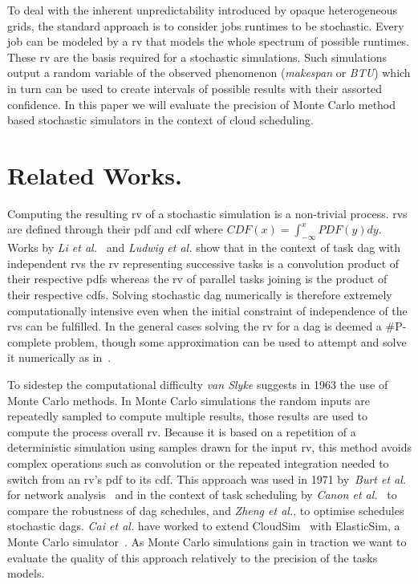 \documentclass[10pt,conference,compsocconf]{IEEEtran}
\newcommand{\etal}[1]{\emph{#1 et al.}}
\begin{document}
To deal with the inherent unpredictability introduced by opaque heterogeneous
grids, the standard approach is to consider jobs runtimes to be stochastic.
Every job can be modeled by a \ac{rv} that models the whole spectrum of
possible runtimes. These \ac{rv} are the basis required for a stochastic
simulations.  Such simulations output a random variable of the observed
phenomenon (\emph{makespan} or \emph{\ac{BTU}}) which in turn can be used to
create intervals of possible results with their assorted confidence. In this
paper we will evaluate the precision of Monte Carlo method based stochastic
simulators in the context of cloud scheduling.

\section{Related Works.}

Computing the resulting \ac{rv} of a stochastic simulation is a non-trivial
process.  \acp{rv} are defined through their \ac{pdf} and \ac{cdf} where $CDF(x)
= \int_{-\infty}^{x} PDF(y) dy$. Works by \etal{Li}~\cite{Li97} and
\etal{Ludwig}\cite{Ludwig01} show that in the context of task \ac{dag} with
independent \acp{rv} the \ac{rv} representing successive tasks is a convolution
product of their respective \acp{pdf} whereas the \ac{rv} of parallel tasks
joining is the product of their respective \acp{cdf}. Solving stochastic
\ac{dag} numerically is therefore extremely computationally intensive even when
the initial constraint of independence of the \acp{rv} can be fulfilled. In the
general cases solving the \ac{rv} for a \ac{dag} is deemed a \#P-complete
problem, though some approximation can be used to attempt and solve it
numerically as in~\cite{dodin85}.

To sidestep the computational difficulty \emph{van Slyke} suggests in
1963\cite{Slyke63} the use of Monte Carlo methods. In Monte Carlo
simulations the random inputs are repeatedly sampled to compute multiple
results, those results are used to compute the process overall \acl{rv}. Because
it is based on a repetition of a deterministic simulation using samples drawn
for the input \ac{rv}, this method avoids complex operations such as
convolution or the repeated integration needed to switch from an \ac{rv}'s
\ac{pdf} to its \ac{cdf}. This approach was used in 1971 by~\etal{Burt} for
network analysis~\cite{burt71} and in the context of task scheduling by
\etal{Canon}~\cite{Canon10} to compare the robustness of \ac{dag} schedules, and
\etal{Zheng}, to optimise schedules stochastic \acp{dag}. \etal{Cai} have worked
to extend CloudSim~\cite{cloudsim} with ElasticSim, a Monte Carlo
simulator~\cite{cai16}. As Monte Carlo simulations gain in traction we want to
evaluate the quality of this approach relatively to the precision of the tasks
models.
\end{document}
